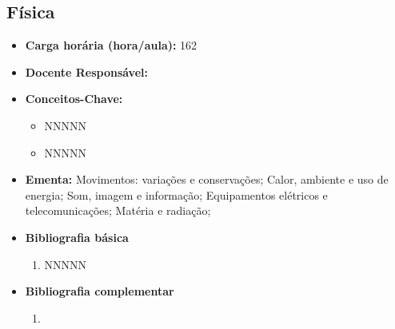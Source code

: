 \documentclass[11pt,fleqn]{book} %
\begin{document}
\subsection{Física}\label{disc:fisica}
\begin{itemize}
	\item \textbf{Carga horária (hora/aula):} 162
	\item \textbf{Docente Responsável:}
	\item \textbf{Conceitos-Chave:}
	\begin{itemize}
		\item NNNNN
		\item NNNNN
	\end{itemize}
	\item \textbf{Ementa:} Movimentos: variações e conservações;
	Calor, ambiente e uso de energia;
	Som, imagem e informação;
	Equipamentos elétricos e telecomunicações;
	Matéria e radiação;
	\item \textbf{Bibliografia básica}
	\begin{enumerate}
		\item NNNNN
	\end{enumerate}
	\item \textbf{Bibliografia complementar}
	\begin{enumerate}
		\item 
	\end{enumerate}	
\end{itemize}


\newpage
\end{document}
